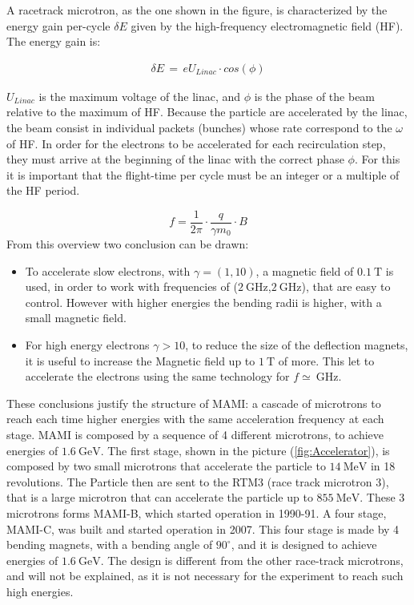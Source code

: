 A racetrack microtron, as the one shown in the figure, is characterized by the energy gain per-cycle $\delta E$ given by the high-frequency electromagnetic field (HF). The energy gain is: 

\begin{align*}
\delta E \, = \, e U_{Linac} \cdot cos(\phi)
\end{align*} 

$U_{Linac}$ is the maximum voltage of the linac, and $\phi$ is the phase of the beam relative to the maximum of HF. Because the particle are accelerated by the linac, the beam consist in individual packets (bunches) whose rate correspond to the $\omega$ of HF. In order for the electrons to be accelerated for each recirculation step, they must arrive at the beginning of the linac with the correct phase $\phi$. For this it is important that the flight-time per cycle must be an integer or a multiple of the HF period.

\begin{equation} \label{eq:frequency}
f = \frac{1}{2 \pi} \cdot \dfrac{q}{\gamma m_{0}} \cdot B
\end{equation}
From this overview two conclusion can be drawn:
\begin{itemize}
\item To accelerate slow electrons, with $\gamma = (1,10)$, a magnetic field of $\SI{0.1}{\tesla}$ is used, in order to work with frequencies of ($\SI{2}{\giga \hertz}$,$\SI{2}{\giga \hertz}$), that are easy to control. However with higher energies the bending radii is higher, with a small magnetic field.
\item For high energy electrons $\gamma > 10$, to reduce the size of the deflection magnets, it is useful to increase the Magnetic field up to $\SI{1}{\tesla}$ of more. This let to accelerate the electrons using the same technology for $f \simeq \SI{}{\giga \hertz}$.
\end{itemize}

These conclusions justify the structure of MAMI: a cascade of microtrons to reach each time higher energies with the same acceleration frequency at each stage. \medskip
MAMI is composed by a sequence of 4 different microtrons, to achieve energies of $\SI{1.6}{\giga \electronvolt}$. The first stage, shown in the picture (\ref{fig:Accelerator}), is composed by two small microtrons that accelerate the particle to $\SI{14}{\mega \electronvolt}$ in 18 revolutions. The Particle then are sent to the RTM3 (race track microtron 3), that is a large microtron that can accelerate the particle up to $\SI{855}{\mega \electronvolt}$. These 3 microtrons forms MAMI-B, which started operation in 1990-91. A four stage, MAMI-C, was built and started operation in 2007. This four stage is made by 4 bending magnets, with a bending angle of $90^{\circ}$, and it is designed to achieve energies of $\SI{1.6}{\giga \electronvolt}$. The design is different from the other race-track microtrons, and will not be explained, as it is not necessary for the experiment to reach such high energies.

